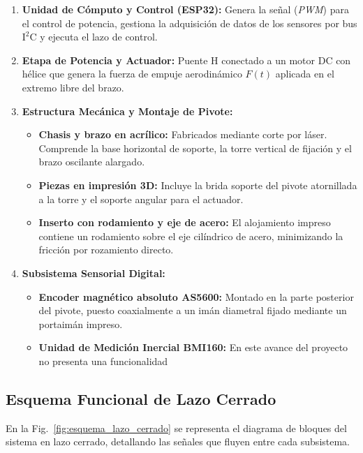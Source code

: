 \begin{enumerate}
  \item \textbf{Unidad de Cómputo y Control (ESP32):} 
  Genera la señal (\textit{PWM}) para el control de potencia, gestiona la adquisición de datos de los sensores por bus $\mathrm{I^2C}$ y ejecuta el lazo de control.

  \item \textbf{Etapa de Potencia y Actuador:} 
  Puente H conectado a un motor DC con hélice que genera la fuerza de empuje aerodinámico $F(t)$ aplicada en el extremo libre del brazo. 

  \item \textbf{Estructura Mecánica y Montaje de Pivote:} 
  \begin{itemize}
    \item \textbf{Chasis y brazo en acrílico:} Fabricados mediante corte por láser. Comprende la base horizontal de soporte, la torre vertical de fijación y el brazo oscilante alargado.
    
    \item \textbf{Piezas en impresión 3D:} Incluye la brida soporte del pivote atornillada a la torre y el soporte angular para el actuador.
    
    \item \textbf{Inserto con rodamiento y eje de acero:} El alojamiento impreso contiene un rodamiento sobre el eje cilíndrico de acero, minimizando la fricción por rozamiento directo.
  \end{itemize}

  \item \textbf{Subsistema Sensorial Digital:} 
  \begin{itemize}
    \item \textbf{Encoder magnético absoluto AS5600:} Montado en la parte posterior del pivote, puesto coaxialmente a un imán diametral fijado mediante un portaimán impreso.
    \item \textbf{Unidad de Medición Inercial BMI160:} En este avance del proyecto no presenta una funcionalidad
  \end{itemize}
\end{enumerate}

\subsection{Esquema Funcional de Lazo Cerrado}
En la Fig.~\ref{fig:esquema_lazo_cerrado} se representa el diagrama de bloques del sistema en lazo cerrado, detallando las señales que fluyen entre cada subsistema.

